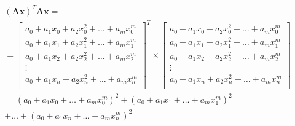 \documentclass{article}
\newcommand{\x}{\mathbf{x}}
\newcommand{\A}{\mathbf{A}}
\begin{document}
\begin{equation} \label{eqn:axtax}
\begin{split}
    & (\A\x)^T \A\x = \\
    & =
    \begin{bmatrix}
        a_0 + a_1 x_0 + a_2 x_0 ^2 + \ldots + a_m x_0^m \\
        a_0 + a_1 x_1 + a_2 x_1 ^2 + \ldots + a_m x_1^m \\
        a_0 + a_1 x_2 + a_2 x_2 ^2 + \ldots + a_m x_2^m \\
        \vdots \\
        a_0 + a_1 x_n + a_2 x_n ^2 + \ldots + a_m x_n^m \\
    \end{bmatrix} ^T
    \times
    \begin{bmatrix}
        a_0 + a_1 x_0 + a_2 x_0 ^2 + \ldots + a_m x_0^m \\
        a_0 + a_1 x_1 + a_2 x_1 ^2 + \ldots + a_m x_1^m \\
        a_0 + a_1 x_2 + a_2 x_2 ^2 + \ldots + a_m x_2^m \\
        \vdots \\
        a_0 + a_1 x_n + a_2 x_n ^2 + \ldots + a_m x_n^m \\
    \end{bmatrix} \\
    & = (a_0 + a_1 x_0 + \ldots + a_m x_0^m)^ 2 + (a_0 + a_1 x_1 + \ldots + a_m x_1^m)^ 2\\
    & + \ldots + (a_0 + a_1 x_n + \ldots + a_m x_n^m)^ 2
\end{split}
\end{equation}
\end{document}

